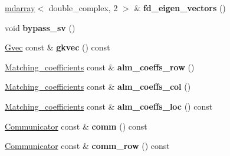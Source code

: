 \begin{DoxyCompactItemize}
\item 
\hypertarget{classsirius_1_1_k__point_a92e3c63d0a3717cc9f81120a9643a1d1}{}\hyperlink{classsddk_1_1mdarray}{mdarray}$<$ double\+\_\+complex, 2 $>$ \& {\bfseries fd\+\_\+eigen\+\_\+vectors} ()\label{classsirius_1_1_k__point_a92e3c63d0a3717cc9f81120a9643a1d1}

\item 
\hypertarget{classsirius_1_1_k__point_a7cc1f60876b6e419b5096807fd656dbe}{}void {\bfseries bypass\+\_\+sv} ()\label{classsirius_1_1_k__point_a7cc1f60876b6e419b5096807fd656dbe}

\item 
\hypertarget{classsirius_1_1_k__point_a0b4f0c4bcf810ad3ea616acd382b7001}{}\hyperlink{classsddk_1_1_gvec}{Gvec} const \& {\bfseries gkvec} () const \label{classsirius_1_1_k__point_a0b4f0c4bcf810ad3ea616acd382b7001}

\item 
\hypertarget{classsirius_1_1_k__point_a5dd01da21c1b9242f391edda94067958}{}\hyperlink{classsirius_1_1_matching__coefficients}{Matching\+\_\+coefficients} const \& {\bfseries alm\+\_\+coeffs\+\_\+row} ()\label{classsirius_1_1_k__point_a5dd01da21c1b9242f391edda94067958}

\item 
\hypertarget{classsirius_1_1_k__point_a2e7ef5e190d39efcd8a95ee08454384a}{}\hyperlink{classsirius_1_1_matching__coefficients}{Matching\+\_\+coefficients} const \& {\bfseries alm\+\_\+coeffs\+\_\+col} ()\label{classsirius_1_1_k__point_a2e7ef5e190d39efcd8a95ee08454384a}

\item 
\hypertarget{classsirius_1_1_k__point_a68f2ee1e2b12b5b21ca4aa86c66f78cf}{}\hyperlink{classsirius_1_1_matching__coefficients}{Matching\+\_\+coefficients} const \& {\bfseries alm\+\_\+coeffs\+\_\+loc} () const \label{classsirius_1_1_k__point_a68f2ee1e2b12b5b21ca4aa86c66f78cf}

\item 
\hypertarget{classsirius_1_1_k__point_ac5349ccf36b289e04548a35ca3ae8336}{}\hyperlink{classsddk_1_1_communicator}{Communicator} const \& {\bfseries comm} () const \label{classsirius_1_1_k__point_ac5349ccf36b289e04548a35ca3ae8336}

\item 
\hypertarget{classsirius_1_1_k__point_a34269007d957fc824bf3f8098f958b6a}{}\hyperlink{classsddk_1_1_communicator}{Communicator} const \& {\bfseries comm\+\_\+row} () const \label{classsirius_1_1_k__point_a34269007d957fc824bf3f8098f958b6a}


\end{DoxyCompactItemize}
